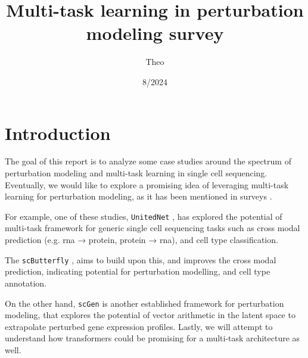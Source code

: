 \documentclass[12pt, a4paper]{article}
\begin{document}
\title{\vspace{-1cm}
Multi-task learning in perturbation modeling survey}

\author{Theo}


\date{8/2024}


\sloppy
\maketitle

{
\hypersetup{linkcolor=black}
\tableofcontents
}

\clearpage

\section{Introduction}
\label{sec:introduction}

The goal of this report is to analyze some case studies around the spectrum of perturbation modeling and multi-task learning in single cell sequencing. Eventually, we would like to explore a promising idea of leveraging multi-task learning for perturbation modeling, as it has been mentioned in surveys \cite{jiMachineLearningPerturbational2021}.

For example, one of these studies, \verb|UnitedNet| \cite{tangExplainableMultitaskLearning2023}, has explored the potential of multi-task framework for generic single cell sequencing tasks such as cross modal prediction (e.g. rna → protein, protein → rna), and cell type classification.

The \verb|scButterfly| \cite{caoScButterflyVersatileSinglecell2024}, aims to build upon this, and improves the cross modal prediction, indicating potential for perturbation modelling, and cell type annotation.

On the other hand, \verb|scGen| \cite{lotfollahiScGenPredictsSinglecell2019} is another established framework for perturbation modeling, that explores the potential of vector arithmetic in the latent space to extrapolate perturbed gene expression profiles. Lastly, we will attempt to understand how transformers could be promising for a multi-task architecture as well.
\end{document}
